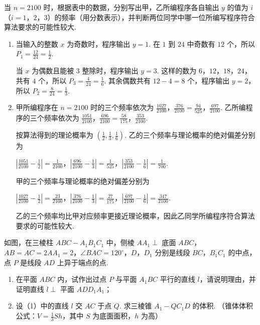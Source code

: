 \begin{problem}
\begin{enumerate}
当 \(n=2100\) 时，根据表中的数据，分别写出甲，乙所编程序各自输出 \(y\) 的值为 \(i\)（\(i=1\)，\(2\)，\(3\)）的频率（用分数表示），并判断两位同学中哪一位所编写程序符合算法要求的可能性较大.
\end{enumerate}

\end{problem}

\begin{solution}
\begin{enumerate}
\item 当输入的整数 \(x\) 为奇数时，程序输出 \(y=1\). 在 \(1\) 到 \(24\) 中奇数有 \(12\) 个，所以 \(P_1=\frac{12}{24}=\frac12\).

当 \(x\) 为偶数且能被 \(3\) 整除时，程序输出 \(y=3\). 这样的数为 \(6\)，\(12\)，\(18\)，\(24\)，共有 \(4\) 个，所以 \(P_3=\frac4{24}=\frac16\). 其余偶数共有 \(12-4=8\) 个，程序输出 \(y=2\)，所以 \(P_2=\frac8{24}=\frac13\).

\item 甲所编程序在 \(n=2100\) 时的三个频率依次为 \(\frac{1027}{2100}\)，\(\frac{376}{2100}=\frac{94}{525}\)，\(\frac{697}{2100}\). 乙所编程序的三个频率依次为 \(\frac{1051}{2100}\)，\(\frac{696}{2100}=\frac{58}{175}\)，\(\frac{353}{2100}\).

按算法得到的理论概率为 \(\left(\frac12,\frac13,\frac16\right)\). 乙的三个频率与理论概率的绝对偏差分别为

\(\left|\frac{1051}{2100}-\frac12\right|=\frac1{2100}\)，\(\left|\frac{696}{2100}-\frac13\right|=\frac1{525}\)，\(\left|\frac{353}{2100}-\frac16\right|=\frac1{700}\).

甲的三个频率与理论概率的绝对偏差分别为

\(\left|\frac{1027}{2100}-\frac12\right|=\frac{23}{2100}\)，\(\left|\frac{376}{2100}-\frac13\right|=\frac{27}{175}\)，\(\left|\frac{697}{2100}-\frac16\right|=\frac{347}{2100}\).

乙的三个频率均比甲对应频率更接近理论概率，因此乙同学所编程序符合算法要求的可能性较大.
\end{enumerate}
\end{solution}

\begin{problem}
如图，在三棱柱 \(ABC-A_{1}B_{1}C_{1}\) 中，侧棱 \(AA_{1}\perp\) 底面 \(ABC\)，\(AB=AC=2AA_{1}=2\)，\(\angle BAC=120^{\circ}\)，\(D\)，\(D_{1}\) 分别是线段 \(BC\)，\(B_{1}C_{1}\) 的中点，点 \(P\) 是线段 \(AD\) 上异于端点的点.
\begin{enumerate}
\item 在平面 \(ABC\) 内，试作出过点 \(P\) 与平面 \(A_{1}BC\) 平行的直线 \(l\)，请说明理由，并证明直线 \(l\perp\) 平面 \(ADD_{1}A_{1}\)；
\item 设（1）中的直线 \(l\) 交 \(AC\) 于点 \(Q\). 求三棱锥 \(A_{1}-QC_{1}D\) 的体积. （锥体体积公式：\(V=\frac13Sh\)，其中 \(S\) 为底面面积，\(h\) 为高）
\end{enumerate}
\end{problem}

